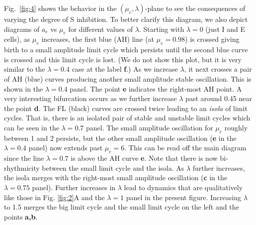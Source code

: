 \documentclass[10pt,letterpaper]{article}
\begin{document}
Fig.~\ref{fig:4} shows the behavior in the $(\mu_e,\lambda)$-plane to see the consequences of varying the degree of S inhibition. To better clarify this diagram, we also depict diagrams of $a_e$ vs $\mu_e$ for different values of $\lambda$. Starting with $\lambda=0$ (just I and E cells), as $\mu_e$ increases, the first blue (AH) line (at $\mu_e=0.98$) is crossed  giving birth to a small amplitude limit cycle which persists until the second blue curve is crossed and this limit cycle is lost. (We do not show this plot, but it is very similar to the $\lambda=0.4$ case at the label {\bf f}.) As we increase $\lambda$, it next crosses a pair of AH (blue) curves producing another small amplitude stable oscillation.  This is shown in the $\lambda=0.4$ panel. The point {\bf e} indicates the right-most AH point. A very interesting bifurcation occurs as we further increase $\lambda$ past around 0.45 near the point {\bf d}. The FL (black) curves are crossed twice leading to an {\em isola} of limit cycles. That is, there is an isolated pair of stable and unstable limit cycles which can be seen in the $\lambda=0.7$ panel. The small amplitude oscillation for $\mu_e$ roughly between 1 and 2 persists, but the other small amplitude oscillation ({\bf e} in the $\lambda=0.4$ panel) now extends past $\mu_e=6$. This can be read off the main diagram since the line $\lambda=0.7$ is above the AH curve {\bf e}.  Note that there is now bi-rhythmicity between the small limit cycle and the isola. As $\lambda$ further increases, the isola merges with the right-most small amplitude oscillation ({\bf c} in the $\lambda=0.75$ panel). Further increases in $\lambda$ lead to dynamics that are qualitatively like those in Fig. \ref{fig:2}A and the $\lambda=1$ panel in the present figure. Increasing $\lambda$ to 1.5 merges the big limit cycle and the small limit cycle on the left and the points {\bf a,b}. 
\end{document}
